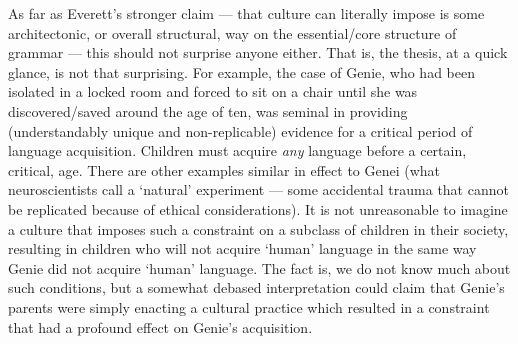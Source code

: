 \documentclass[11pt]{article}
\begin{document}
As far as Everett's stronger claim --- that culture can literally impose is some architectonic, or overall structural, way on the essential/core structure of grammar --- this should not surprise anyone either. That is, the thesis, at a quick glance, is not that surprising. For example, the case of Genie, who had been isolated in a locked room and forced to sit on a chair until she was discovered/saved around the age of ten, was seminal in providing (understandably unique and non-replicable) evidence for a critical period of language acquisition. Children must acquire \textsl{any} language before a certain, critical, age. There are other examples similar in effect to Genei (what neuroscientists call a `natural' experiment --- some accidental trauma that cannot be replicated because of ethical considerations). It is not unreasonable to imagine a culture that imposes such a constraint on a subclass of children in their society, resulting in children who will not acquire `human' language in the same way Genie did not acquire `human' language. The fact is, we do not know much about such conditions, but a somewhat debased interpretation could claim that Genie's parents were simply enacting a cultural practice which resulted in a constraint that had a profound effect on Genie's acquisition.
\end{document}
